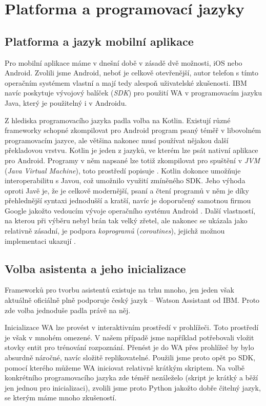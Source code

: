 \section{Platforma a programovací jazyky}\label{analysis}

\subsection{Platforma a jazyk mobilní aplikace}
Pro mobilní aplikace máme v dnešní době v zásadě dvě možnosti, iOS nebo Android.
Zvolili jsme Android, neboť je celkově otevřenější, autor telefon s tímto
operačním systémem vlastní a mají tedy alespoň uživatelské zkušenosti. IBM navíc
poskytuje vývojový balíček (\textit{SDK}) pro použití WA v programovacím
jazyku Java, který je použitelný i v Androidu.

Z hlediska programovacího jazyka padla volba na Kotlin. Existují různé frameworky
schopné zkompilovat pro Android program psaný téměř v libovolném programovacím
jazyce, ale většina nakonec musí používat nějakou další překladovou vrstvu.
Kotlin je jeden z jazyků, ve kterém lze psát nativní aplikace pro Android. Programy
v něm napsané lze totiž zkompilovat pro spuštění v \textit{JVM} (\textit{Java Virtual Machine}),
toto prostředí popisuje \citet{prof_tejinder_singh_hotspot_2014}.
Kotlin dokonce umožňuje interoperabilitu s Javou, což umožnilo
využití zmíněného SDK. Jeho výhoda oproti Javě je, že je celkově modernější,
psaní a čtení programů v něm je díky přehlednější syntaxi jednodušší a kratší,
navíc je doporučený samotnou firmou Google jakožto vedoucím vývoje operačního
systému Android \citep{android_blog}.
Další vlastností, na kterou při výběru nebyl brán tak velký
zřetel, ale nakonec se ukázala jako relativně zásadní, je podpora \textit{koprogramů}
(\textit{coroutines}), jejichž možnou implementaci ukazují \citet{theory_practice_coroutines}.

\subsection{Volba asistenta a jeho inicializace}
Frameworků pro tvorbu asistentů existuje na trhu mnoho, jen jeden však aktuálně oficiálně plně
podporuje český jazyk -- Watson Assistant od IBM. Proto zde volba jednoduše
padla právě na něj.

Inicializace WA lze provést v interaktivním prostředí v prohlížeči. Toto
prostředí je však v mnohém omezené. V našem případě jsme například potřebovali
vložit stovky entit pro trénování rozpoznání. Přenést je do WA přes prohlížeč
by bylo absurdně náročné, navíc složitě replikovatelné. Použili jsme proto opět
po SDK, pomocí kterého můžeme WA iniciovat relativně krátkým skriptem. Na volbě
konkrétního programovacího jazyka zde téměř nezáleželo (skript je krátký a běží
jen jednou pro inicializaci), zvolili jsme proto Python jakožto dobře čitelný
jazyk, se kterým máme mnoho zkušeností.

